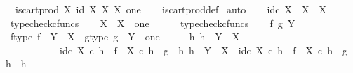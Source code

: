 \begin{isabellebody}
\ \ {\isachardoublequoteopen}is{\isacharunderscore}{\kern0pt}cart{\isacharunderscore}{\kern0pt}prod\ X\ {\isacharparenleft}{\kern0pt}id\ X{\isacharparenright}{\kern0pt}\ {\isacharparenleft}{\kern0pt}{\isasymbeta}\isactrlbsub X\isactrlesub {\isacharparenright}{\kern0pt}\ X\ one{\isachardoublequoteclose}\isanewline
%
\isadelimproof
\ \ %
\endisadelimproof
%
\isatagproof
{}\isamarkupfalse%
\ is{\isacharunderscore}{\kern0pt}cart{\isacharunderscore}{\kern0pt}prod{\isacharunderscore}{\kern0pt}def\isanewline
{}\isamarkupfalse%
\ auto\isanewline
\ \ \isamarkupfalse%
\ {\isachardoublequoteopen}id\isactrlsub c\ X\ {\isacharcolon}{\kern0pt}\ X\ {\isasymrightarrow}\ X{\isachardoublequoteclose}\isanewline
\ \ \ \ \isamarkupfalse%
\ typecheck{\isacharunderscore}{\kern0pt}cfuncs\isanewline
{}\isamarkupfalse%
\isanewline
\ \ \isamarkupfalse%
\ {\isachardoublequoteopen}{\isasymbeta}\isactrlbsub X\isactrlesub \ {\isacharcolon}{\kern0pt}\ X\ {\isasymrightarrow}\ one{\isachardoublequoteclose}\isanewline
\ \ \ \ \isamarkupfalse%
\ typecheck{\isacharunderscore}{\kern0pt}cfuncs\isanewline
{}\isamarkupfalse%
\isanewline
\ \ \isamarkupfalse%
\ f\ g\ Y\isanewline
\ \ \isamarkupfalse%
\ f{\isacharunderscore}{\kern0pt}type{\isacharcolon}{\kern0pt}\ {\isachardoublequoteopen}f\ {\isacharcolon}{\kern0pt}\ Y\ {\isasymrightarrow}\ X{\isachardoublequoteclose}\ \ g{\isacharunderscore}{\kern0pt}type{\isacharcolon}{\kern0pt}\ {\isachardoublequoteopen}g\ {\isacharcolon}{\kern0pt}\ Y\ {\isasymrightarrow}\ one{\isachardoublequoteclose}\isanewline
\ \ \isamarkupfalse%
\ \isamarkupfalse%
\ {\isachardoublequoteopen}{\isasymexists}h{\isachardot}{\kern0pt}\ h\ {\isacharcolon}{\kern0pt}\ Y\ {\isasymrightarrow}\ X\ {\isasymand}\isanewline
\ \ \ \ \ \ \ \ \ \ \ id\isactrlsub c\ X\ {\isasymcirc}\isactrlsub c\ h\ {\isacharequal}{\kern0pt}\ f\ {\isasymand}\ {\isasymbeta}\isactrlbsub X\isactrlesub \ {\isasymcirc}\isactrlsub c\ h\ {\isacharequal}{\kern0pt}\ g\ {\isasymand}\ {\isacharparenleft}{\kern0pt}{\isasymforall}h{}{\isachardot}{\kern0pt}\ h{}\ {\isacharcolon}{\kern0pt}\ Y\ {\isasymrightarrow}\ X\ {\isasymand}\ id\isactrlsub c\ X\ {\isasymcirc}\isactrlsub c\ h{}\ {\isacharequal}{\kern0pt}\ f\ {\isasymand}\ {\isasymbeta}\isactrlbsub X\isactrlesub \ {\isasymcirc}\isactrlsub c\ h{}\ {\isacharequal}{\kern0pt}\ g\ {\isasymlongrightarrow}\ h{}\ {\isacharequal}{\kern0pt}\ h{\isacharparenright}{\kern0pt}{\isachardoublequoteclose}\isanewline

\end{isabellebody}

